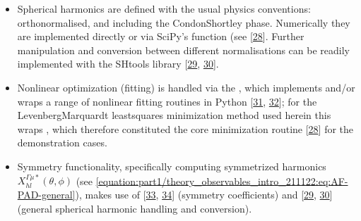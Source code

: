 \documentclass[letterpaper,table,10pt,english]{jupyterBook}
\begin{document}
\begin{itemize}
\item {} 
\sphinxAtStartPar
Spherical harmonics are defined with the usual physics conventions: orthonormalised, and including the Condon\sphinxhyphen{}Shortley phase. Numerically they are implemented directly or via SciPy’s  function (see  {[}\hyperlink{cite.backmatter/bibliography:id730}{28}{]}. Further manipulation and conversion between different normalisations can be readily implemented with the SHtools library {[}\hyperlink{cite.backmatter/bibliography:id800}{29}, \hyperlink{cite.backmatter/bibliography:id740}{30}{]}.

\item {} 
\sphinxAtStartPar
Non\sphinxhyphen{}linear optimization (fitting) is handled via the , which implements and/or wraps a range of non\sphinxhyphen{}linear fitting routines in Python {[}\hyperlink{cite.backmatter/bibliography:id635}{31}, \hyperlink{cite.backmatter/bibliography:id672}{32}{]}; for the Levenberg\sphinxhyphen{}Marquardt least\sphinxhyphen{}squares minimization method used herein this wraps , which therefore constituted the core minimization routine {[}\hyperlink{cite.backmatter/bibliography:id730}{28}{]} for the demonstration cases.

\item {} 
\sphinxAtStartPar
Symmetry functionality, specifically computing symmetrized harmonics \(X_{hl}^{\Gamma\mu*}(\theta,\phi)\) (see \eqref{equation:part1/theory_observables_intro_211122:eq:AF-PAD-general}), makes use of  {[}\hyperlink{cite.backmatter/bibliography:id593}{33}, \hyperlink{cite.backmatter/bibliography:id594}{34}{]} (symmetry coefficients) and  {[}\hyperlink{cite.backmatter/bibliography:id800}{29}, \hyperlink{cite.backmatter/bibliography:id740}{30}{]} (general spherical harmonic handling and conversion).

\end{itemize}
\end{document}
